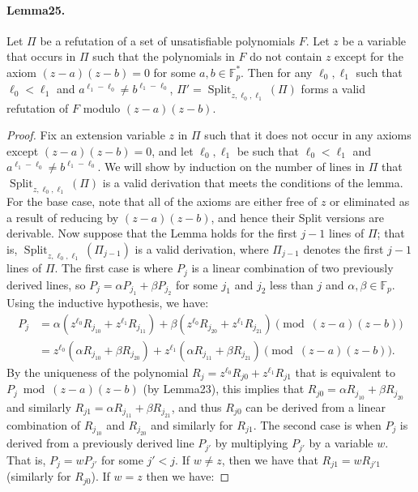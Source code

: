 \documentclass[10pt,a4paper]{article}
\DeclareMathOperator{\Split}{Split}
\begin{document}
\paragraph{Lemma25.} Let $\Pi$ be a refutation of a set of unsatisfiable polynomials $F$. Let $z$ be a variable that occurs in $\Pi$ such that the polynomials in $F$ do not contain $z$ except for the axiom $(z-a)(z-b)=0$ for some $a,b\in\mathbb F_p^*$. Then for any $\ell_0,\ell_1$ such that $\ell_0<\ell_1$ and $a^{\ell_1-\ell_0}\neq b^{\ell_1-\ell_0}$, $\Pi'=\Split_{z,\ell_0,\ell_1}(\Pi)$ forms a valid refutation of $F$ modulo $(z-a)(z-b)$.
\begin{proof}
Fix an extension variable $z$ in $\Pi$ such that it does not occur in any axioms except $(z-a)(z-b)=0$, and let $\ell_0,\ell_1$ be such that $\ell_0<\ell_1$ and $a^{\ell_1-\ell_0}\neq b^{\ell_1-\ell_0}$. We will show by induction on the number of lines in $\Pi$ that $\Split_{z,\ell_0,\ell_1}(\Pi)$ is a valid derivation that meets the conditions of the lemma. For the base case, note that all of the axioms are either free of $z$ or eliminated as a result of reducing by $(z-a)(z-b)$, and hence their Split versions are derivable. Now suppose that the Lemma holds for the first $j-1$ lines of $\Pi$; that is, $\Split_{z,\ell_0,\ell_1}(\Pi_{j-1})$ is a valid derivation, where $\Pi_{j-1}$ denotes the first $j-1$ lines of $\Pi$.
The first case is where $P_j$ is a linear combination of two previously derived lines, so $P_j=\alpha P_{j_1}+\beta P_{j_2}$ for some $j_1$ and $j_2$ less than $j$ and $\alpha,\beta\in\mathbb F_p$. Using the inductive hypothesis, we have:
\begin{align*}
P_j&=\alpha(z^{\ell_0}R_{j_10}+z^{\ell_1}R_{j_11})+\beta(z^{\ell_0}R_{j_20}+z^{\ell_1}R_{j_21})\pmod{(z-a)(z-b)}\\
&=z^{\ell_0}(\alpha R_{j_10}+\beta R_{j_20})+z^{\ell_1}(\alpha R_{j_11}+\beta R_{j_21})\pmod{(z-a)(z-b)}.
\end{align*}
By the uniqueness of the polynomial $R_j=z^{\ell_0}R_{j0}+z^{\ell_1}R_{j1}$ that is equivalent to $P_j\bmod(z-a)(z-b)$ (by Lemma23), this implies that $R_{j0}=\alpha R_{j_10}+\beta R_{j_20}$ and similarly $R_{j1}=\alpha R_{j_11}+\beta R_{j_21}$, and thus $R_{j0}$ can be derived from a linear combination of $R_{j_10}$ and $R_{j_20}$ and similarly for $R_{j1}$.
The second case is when $P_j$ is derived from a previously derived line $P_{j'}$ by multiplying $P_{j'}$ by a variable $w$. That is, $P_j=wP_{j'}$ for some $j'<j$. If $w\neq z$, then we have that $R_{j1}=wR_{j'1}$ (similarly for $R_{j0}$). If $w=z$ then we have:

\end{proof}
\end{document}
